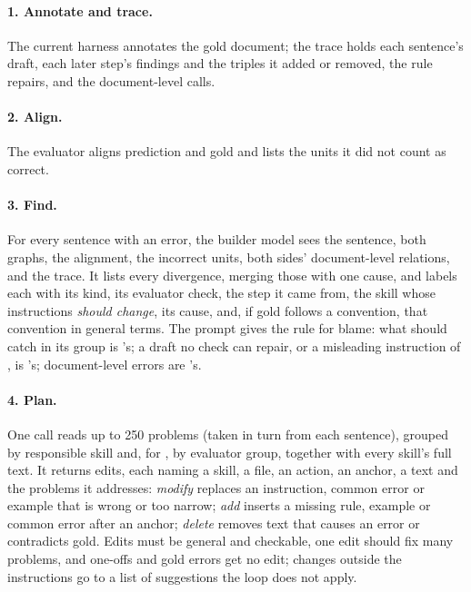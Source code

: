 \paragraph{1. Annotate and trace.} The current harness annotates the gold document; the trace holds each sentence's draft, each later step's findings and the triples it added or removed, the rule repairs, and the document-level calls.

\paragraph{2. Align.} The evaluator aligns prediction and gold and lists the units it did not count as correct.

\paragraph{3. Find.} For every sentence with an error, the builder model sees the sentence, both graphs, the alignment, the incorrect units, both sides' document-level relations, and the trace. It lists every divergence, merging those with one cause, and labels each with its kind, its evaluator check, the step it came from, the skill whose instructions \emph{should change}, its cause, and, if gold follows a convention, that convention in general terms. The prompt gives the rule for blame: what  should catch in its group is 's; a draft no check can repair, or a misleading instruction of , is 's; document-level errors are 's.

\paragraph{4. Plan.} One call reads up to 250 problems (taken in turn from each sentence), grouped by responsible skill and, for , by evaluator group, together with every skill's full text. It returns edits, each naming a skill, a file, an action, an anchor, a text and the problems it addresses: \emph{modify} replaces an instruction, common error or example that is wrong or too narrow; \emph{add} inserts a missing rule, example or common error after an anchor; \emph{delete} removes text that causes an error or contradicts gold. Edits must be general and checkable, one edit should fix many problems, and one-offs and gold errors get no edit; changes outside the instructions go to a list of suggestions the loop does not apply.

